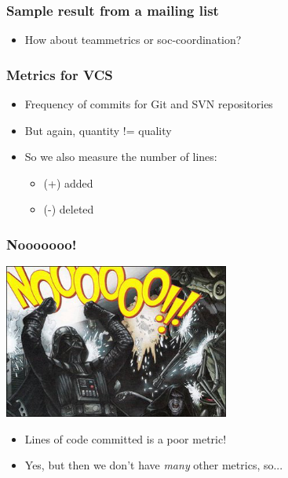 \documentclass[compress]{beamer}
\begin{document}
\begin{frame}
 \frametitle{Sample result from a mailing list}
 \begin{itemize}
   \item How about teammetrics or soc-coordination?
 \end{itemize}

\end{frame}

\begin{frame}
    \frametitle{Metrics for VCS}
    \begin{itemize}
        \item Frequency of commits for Git and SVN repositories
        \pause
        \item But again, quantity != quality
        \pause
        \item So we also measure the number of lines:
        \begin{itemize}
            \item (+) added
            \item (-) deleted
        \end{itemize}
    \end{itemize}

\end{frame}

\begin{frame}
    \frametitle{Nooooooo!}
        \begin{center}
            \includegraphics[height=2.0in]{vaderno.jpg}
        \end{center}
        \begin{itemize}
            \item Lines of code committed is a poor metric!
            \pause
            \item Yes, but then we don't have \textit{many} other metrics, so...
        \end{itemize}
\end{frame}
\end{document}

